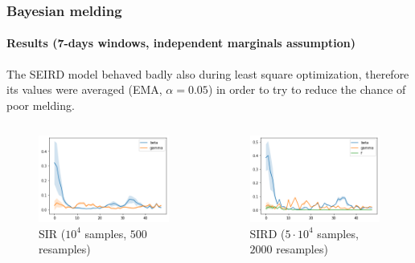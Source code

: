 \documentclass[aspectratio=43]{beamer}
\begin{document}
\begin{frame}
	\frametitle{Bayesian melding}
	\framesubtitle{Results (7-days windows, independent marginals assumption)}
	The SEIRD model behaved badly also during least square optimization, therefore its values were averaged (EMA, $\alpha = 0.05$) in order to try to reduce the chance of poor melding.
	
	
	\begin{columns}
		\begin{figure}
			\includegraphics[width=\textwidth]{img/sir_meld_7.png}
			\caption{SIR ($10^4$ samples, $500$ resamples)}
		\end{figure}
		\begin{figure}
			\includegraphics[width=\textwidth]{img/sird_meld_7.png}
			\caption{SIRD ($5 \cdot 10^4$ samples, $2000$ resamples)}
		\end{figure}

\end{columns}
\end{frame}
\end{document}
